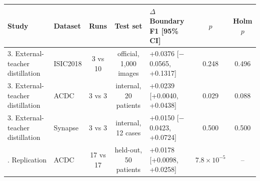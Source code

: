 \begin{tabular}{llcclcc}
\toprule
Study & Dataset & Runs & Test set & $\Delta$ Boundary F1 [95\% CI] & $p$ & Holm $p$ \\
\midrule
3. External-teacher distillation & ISIC2018 & 3 vs 10 & official, 1,000 images & +0.0376 [$-$0.0565, +0.1317] & 0.248 & 0.496 \\
3. External-teacher distillation & ACDC & 3 vs 3 & internal, 20 patients & +0.0239 [+0.0040, +0.0438] & 0.029 & 0.088 \\
3. External-teacher distillation & Synapse & 3 vs 3 & internal, 12 cases & +0.0150 [$-$0.0423, +0.0724] & 0.500 & 0.500 \\
\addlinespace
4. Replication & ACDC & 17 vs 17 & held-out, 50 patients & +0.0178 [+0.0098, +0.0258] & $7.8\times10^{-5}$ & -- \\
\bottomrule
\end{tabular}
